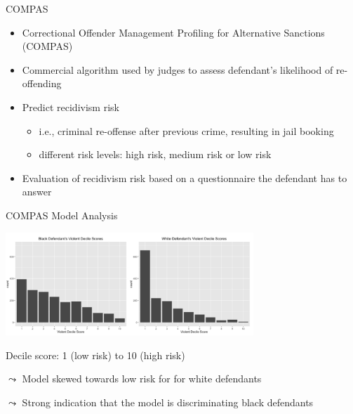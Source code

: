 \documentclass[11pt,compress,t,notes=noshow, aspectratio=169, xcolor=table]{beamer}
\begin{document}





\begin{frame}{COMPAS}

    \begin{itemize}
        \item Correctional Offender Management Profiling for Alternative Sanctions (COMPAS)
        \item Commercial algorithm used by judges to assess defendant’s likelihood of re-offending
        \pause
        \item Predict recidivism risk
        \begin{itemize}
            \item i.e., criminal re-offense after previous crime, resulting in jail booking
            \item different risk levels: high risk, medium risk or low risk
        \end{itemize}
        \pause
        \item Evaluation of recidivism risk based on a questionnaire the defendant has to answer
    \end{itemize}

\end{frame}

\begin{frame}{COMPAS Model Analysis~}

    \centering
    \includegraphics[width=0.7\textwidth]{figure/compass_black_white.PNG}

    Decile score: 1 (low risk) to 10 (high risk)

	$\leadsto$ Model skewed towards low risk for for white defendants
	
	$\leadsto$ Strong indication that the model is discriminating black defendants

\end{frame}
\end{document}

